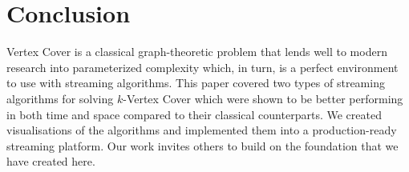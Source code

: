\section{Conclusion}

Vertex Cover is a classical graph-theoretic problem that lends well to modern
research into parameterized complexity which, in turn, is a perfect environment
to use with streaming algorithms. This paper covered two types of streaming
algorithms for solving \(k\)-Vertex Cover which were shown to be better
performing in both time and space compared to their classical counterparts. We
created visualisations of the algorithms and implemented them into a
production-ready streaming platform. Our work invites others to build on the
foundation that we have created here.
